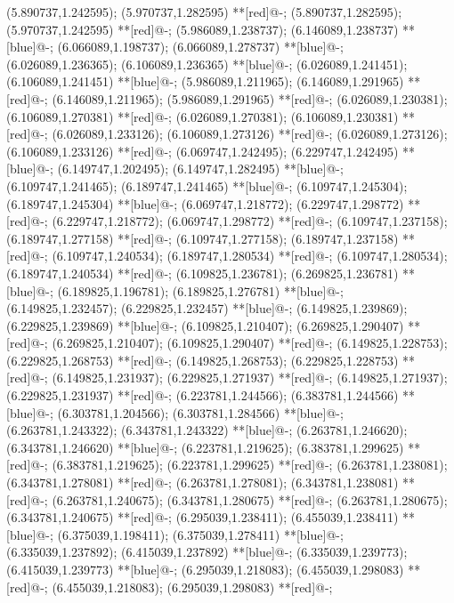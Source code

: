 (5.890737,1.242595); (5.970737,1.282595) **[red]@{-};
(5.890737,1.282595); (5.970737,1.242595) **[red]@{-};
(5.986089,1.238737); (6.146089,1.238737) **[blue]@{-};
(6.066089,1.198737); (6.066089,1.278737) **[blue]@{-};
(6.026089,1.236365); (6.106089,1.236365) **[blue]@{-};
(6.026089,1.241451); (6.106089,1.241451) **[blue]@{-};
(5.986089,1.211965); (6.146089,1.291965) **[red]@{-};
(6.146089,1.211965); (5.986089,1.291965) **[red]@{-};
(6.026089,1.230381); (6.106089,1.270381) **[red]@{-};
(6.026089,1.270381); (6.106089,1.230381) **[red]@{-};
(6.026089,1.233126); (6.106089,1.273126) **[red]@{-};
(6.026089,1.273126); (6.106089,1.233126) **[red]@{-};
(6.069747,1.242495); (6.229747,1.242495) **[blue]@{-};
(6.149747,1.202495); (6.149747,1.282495) **[blue]@{-};
(6.109747,1.241465); (6.189747,1.241465) **[blue]@{-};
(6.109747,1.245304); (6.189747,1.245304) **[blue]@{-};
(6.069747,1.218772); (6.229747,1.298772) **[red]@{-};
(6.229747,1.218772); (6.069747,1.298772) **[red]@{-};
(6.109747,1.237158); (6.189747,1.277158) **[red]@{-};
(6.109747,1.277158); (6.189747,1.237158) **[red]@{-};
(6.109747,1.240534); (6.189747,1.280534) **[red]@{-};
(6.109747,1.280534); (6.189747,1.240534) **[red]@{-};
(6.109825,1.236781); (6.269825,1.236781) **[blue]@{-};
(6.189825,1.196781); (6.189825,1.276781) **[blue]@{-};
(6.149825,1.232457); (6.229825,1.232457) **[blue]@{-};
(6.149825,1.239869); (6.229825,1.239869) **[blue]@{-};
(6.109825,1.210407); (6.269825,1.290407) **[red]@{-};
(6.269825,1.210407); (6.109825,1.290407) **[red]@{-};
(6.149825,1.228753); (6.229825,1.268753) **[red]@{-};
(6.149825,1.268753); (6.229825,1.228753) **[red]@{-};
(6.149825,1.231937); (6.229825,1.271937) **[red]@{-};
(6.149825,1.271937); (6.229825,1.231937) **[red]@{-};
(6.223781,1.244566); (6.383781,1.244566) **[blue]@{-};
(6.303781,1.204566); (6.303781,1.284566) **[blue]@{-};
(6.263781,1.243322); (6.343781,1.243322) **[blue]@{-};
(6.263781,1.246620); (6.343781,1.246620) **[blue]@{-};
(6.223781,1.219625); (6.383781,1.299625) **[red]@{-};
(6.383781,1.219625); (6.223781,1.299625) **[red]@{-};
(6.263781,1.238081); (6.343781,1.278081) **[red]@{-};
(6.263781,1.278081); (6.343781,1.238081) **[red]@{-};
(6.263781,1.240675); (6.343781,1.280675) **[red]@{-};
(6.263781,1.280675); (6.343781,1.240675) **[red]@{-};
(6.295039,1.238411); (6.455039,1.238411) **[blue]@{-};
(6.375039,1.198411); (6.375039,1.278411) **[blue]@{-};
(6.335039,1.237892); (6.415039,1.237892) **[blue]@{-};
(6.335039,1.239773); (6.415039,1.239773) **[blue]@{-};
(6.295039,1.218083); (6.455039,1.298083) **[red]@{-};
(6.455039,1.218083); (6.295039,1.298083) **[red]@{-};
